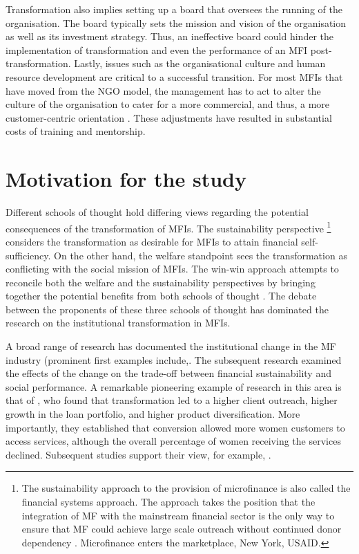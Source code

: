 \documentclass[a4paper, nobind]{templates/ociamthesis}
\begin{document}
Transformation also implies setting up a board that oversees the running of the organisation. The board typically sets the mission and vision of the organisation as well as its investment strategy. Thus, an ineffective board could hinder the implementation of transformation \autocite{campion1999institutional} and even the performance of an MFI post-transformation. Lastly, issues such as the organisational culture and human resource development are critical to a successful transition. For most MFIs that have moved from the NGO model, the management has to act to alter the culture of the organisation to cater for a more commercial, and thus, a more customer-centric orientation \autocite{christen2001commercialization}. These adjustments have resulted in substantial costs of training and mentorship.

\hypertarget{motivation-for-the-study}{%
\section{Motivation for the study}\label{motivation-for-the-study}}

\noindent Different schools of thought hold differing views regarding the potential consequences of the transformation of MFIs. The sustainability perspective \footnote{The sustainability approach to the provision of microfinance is also called the financial systems approach. The approach takes the position that the integration of MF with the mainstream financial sector is the only way to ensure that MF could achieve large scale outreach without continued donor dependency \autocite{rhyne1999microfinance}. Microfinance enters the marketplace, New York, USAID.} considers the transformation as desirable for MFIs to attain financial self-sufficiency. On the other hand, the welfare standpoint sees the transformation as conflicting with the social mission of MFIs. The win-win approach attempts to reconcile both the welfare and the sustainability perspectives by bringing together the potential benefits from both schools of thought \autocite{kodongo2013individual}. The debate between the proponents of these three schools of thought has dominated the research on the institutional transformation in MFIs.

A broad range of research has documented the institutional change in the MF industry (prominent first examples include,\autocite{ledgerwood1998microfinance,ledgerwood2006transforming}. The subsequent research examined the effects of the change on the trade-off between financial sustainability and social performance. A remarkable pioneering example of research in this area is that of \textcite{frank2008stemming}, who found that transformation led to a higher client outreach, higher growth in the loan portfolio, and higher product diversification. More importantly, they established that conversion allowed more women customers to access services, although the overall percentage of women receiving the services declined. Subsequent studies support their view, for example, \autocites[ ]{hartarska2012governance,bos2015practice}{d2017ngos}.
\end{document}
